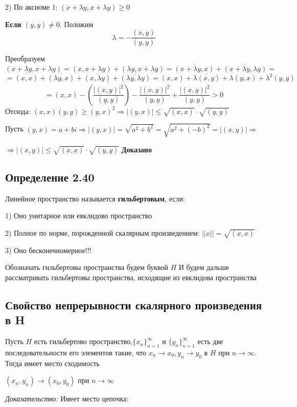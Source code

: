 \documentclass[12pt]{article}
\begin{document}
2)		По аксиоме 1:
		$(x + \lambda y , x + \lambda y) \ge 0$
		
	\textbf{Если $(y,y) \neq 0$}. Положим 
$$\lambda = -\frac{(x,y)}{(y,y)}$$

Преобразуем
	$$(x + \lambda y , x + \lambda y) = (x , x + \lambda y) + (\lambda y , x + \lambda y) 	= 
	\overline{(x + \lambda y , x)} + \overline{(x + \lambda y , \lambda y)} =
	$$
$$ = \overline{(x,x)} + \overline{(\lambda y ,x)} + 
\overline{(x, \lambda y)} + \overline{(\lambda y , \lambda y)} = (x,x) + \overline{\lambda(x, y)} + \lambda( y , x) + \lambda^2 (y,y)
$$
$$
= (x,x) - \overline{(\frac{|(x,y)|^2}{(y,y)})} - \frac{|(x,y)|^2}{(y,y)} + \frac{|(x,y)|^2}{(y,y)} > 0
$$
Отсюда:
$(x,x)(y,y) \ge (y,x)^2 \Rightarrow |(y,x)| \leq \sqrt{(x,x)} \cdot \sqrt{(y,y)} $

Пусть $(y,x) = a + bi \Rightarrow |(y,x)| = \sqrt{a^2 + b^2}=  \sqrt{a^2 + (-b)^2} = |(x,y)| \Rightarrow$

$ \Rightarrow |(x,y)| \leq \sqrt{(x,x)} \cdot \sqrt{(y,y)}$ \textbf{Доказано}

\subsection*{Определение 2.40}
	Линейное пространство называется \textbf{гильбертовым}, если:
	
	1) Оно унитарное или евклидово пространство
	
	2) Полное по норме, порожденной скалярным произведением: 
	$||x|| = \sqrt{(x,x)} $
	
	3) Оно бесконечномерное!!!

Обозначать гильбертовы пространства будем буквой $H$
И будем дальше рассматривать гильбертовы пространства, исходящие из
евклидова пространства 

\subsection{Свойство непрерывности скалярного произведения в H}
	Пусть $H$ есть гильбертово пространство,$\{ x_n \}_{n = 1}^{\infty}$ и $\{ y_n \}_{n = 1}^{\infty}$ есть две последовательности его элементов такие,
что $x_n \to x_0, y_n \to y_0$ в $H$ при $n \to \infty$. Тогда имеет место сходимость
	\begin{center}
		$(x_n, y_n) \to (x_0, y_0)$ при $ n \to \infty$
	\end{center}

\textit{Доказательство:} Имеет место цепочка:
\end{document}
